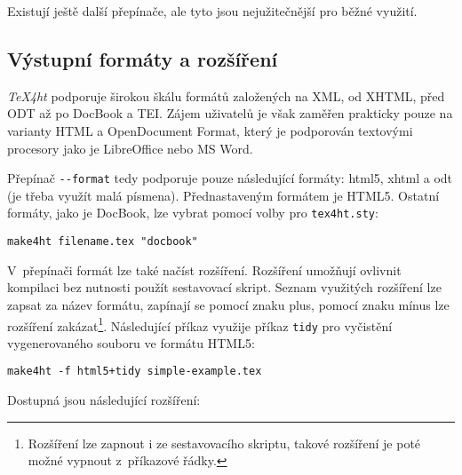 \documentclass{csbulletin}
\newcommand\nazev[1]{\textit{#1}}
\newcommand\prikaz[1]{\texttt{#1}}
\newcommand\prepinac[1]{\texttt{-\/-#1}}
\begin{document}
Existují ještě další přepínače, ale tyto jsou nejužitečnější pro běžné využití.

\subsection{Výstupní formáty a rozšíření}

\nazev{TeX4ht} podporuje širokou škálu formátů založených na XML, od XHTML,
před ODT až po DocBook a TEI. Zájem uživatelů je však zaměřen prakticky pouze
na varianty HTML a OpenDocument Format, který 
je podporován textovými procesory jako je LibreOffice nebo MS Word.

Přepínač \prepinac{format} tedy podporuje pouze následující formáty: html5,
xhtml a odt (je třeba využít malá písmena). Přednastaveným formátem je HTML5.
Ostatní formáty, jako je DocBook, lze vybrat pomocí volby pro \prikaz{tex4ht.sty}:

\begin{verbatim}
make4ht filename.tex "docbook"
\end{verbatim}



V~přepínači formát lze také načíst rozšíření.  Rozšíření umožňují ovlivnit kompilaci
bez nutnosti použít sestavovací skript. 
Seznam využitých rozšíření lze zapsat za název formátu, zapínají se pomocí
znaku plus, pomocí znaku mínus lze rozšíření zakázat\footnote{Rozšíření lze
  zapnout i ze sestavovacího skriptu, takové rozšíření je poté možné vypnout
z~příkazové řádky.}. Následující příkaz využije příkaz \prikaz{tidy} pro
vyčistění vygenerovaného souboru ve formátu HTML5:

\begin{verbatim}
make4ht -f html5+tidy simple-example.tex
\end{verbatim}

Dostupná jsou následující rozšíření:
\end{document}
